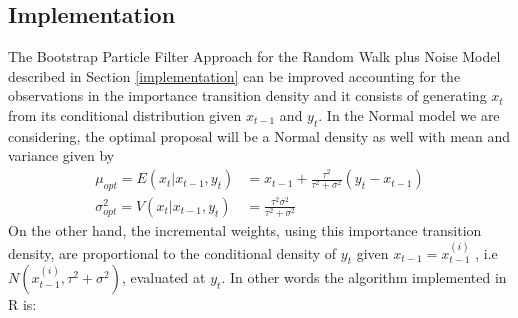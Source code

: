 \documentclass[
]{book}
\theoremstyle{break}
\theoremstyle{nonumberplain}
\begin{document}
\subsection{Implementation}

The Bootstrap Particle Filter Approach for the Random Walk plus Noise
Model described in Section \ref{implementation} can be improved
accounting for the observations in the importance transition density and
it consists of generating \(x_{t}\) from its conditional distribution
given \(x_{t-1}\) and \(y_{t}\). In the Normal model we are considering,
the optimal proposal will be a Normal density as well with mean and
variance given by \begin{align*}
\mu_{opt}=E(x_{t}|x_{t-1},y_{t})&=x_{t-1}+\frac{\tau^{2}}{\tau^{2}+\sigma^{2}}(y_{t}-x_{t-1})\\
\sigma_{opt}^{2}=V(x_{t}|x_{t-1},y_{t})&=\frac{\tau^{2}\sigma^{2}}{\tau^{2}+\sigma^{2}}
\end{align*} On the other hand, the incremental weights, using this
importance transition density, are proportional to the conditional
density of \(y_{t}\) given \(x_{t-1}=x_{t-1}^{(i)}\) , i.e
\(N(x_{t-1}^{(i)},\tau^{2}+\sigma^{2})\), evaluated at \(y_{t}\). In
other words the algorithm implemented in R is:
\end{document}
